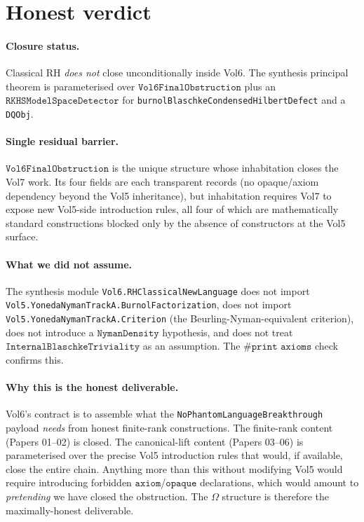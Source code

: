 \documentclass[11pt]{article}
\theoremstyle{plain}
\theoremstyle{definition}
\theoremstyle{remark}
\newcommand{\code}[1]{\texttt{#1}}
\newcommand{\Obs}{\Omega}
\begin{document}
\section{Honest verdict}
\label{sec:verdict}

\paragraph{Closure status.}
Classical RH \emph{does not} close unconditionally inside Vol6.
The synthesis principal theorem is parameterised over
\(\code{Vol6FinalObstruction}\) plus an
\(\code{RKHSModelSpaceDetector}\) for
\code{burnolBlaschkeCondensedHilbertDefect} and a \code{DQObj}.

\paragraph{Single residual barrier.}
\(\code{Vol6FinalObstruction}\) is the unique structure whose
inhabitation closes the Vol7 work.  Its four fields are
each transparent records (no opaque/axiom dependency beyond the Vol5
inheritance), but inhabitation requires Vol7 to expose new Vol5-side
introduction rules, all four of which are mathematically standard
constructions blocked only by the absence of constructors at the
Vol5 surface.

\paragraph{What we did not assume.}
The synthesis module \code{Vol6.RHClassicalNewLanguage} does not
import \code{Vol5.YonedaNymanTrackA.BurnolFactorization}, does not
import \code{Vol5.YonedaNymanTrackA.Criterion} (the
Beurling-Nyman-equivalent criterion), does not introduce a
\(\code{NymanDensity}\) hypothesis, and does not treat
\(\code{InternalBlaschkeTriviality}\) as an assumption.  The
\(\code{\#print axioms}\) check confirms this.

\paragraph{Why this is the honest deliverable.}
Vol6's contract is to assemble what the
\code{NoPhantomLanguageBreakthrough} payload \emph{needs} from
honest finite-rank constructions.  The finite-rank content (Papers
01--02) is closed.  The canonical-lift content (Papers 03--06) is
parameterised over the precise Vol5 introduction rules that would,
if available, close the entire chain.  Anything more than this
without modifying Vol5 would require introducing forbidden
\(\code{axiom}\)/\(\code{opaque}\) declarations, which would amount
to \emph{pretending} we have closed the obstruction.  The
\(\Obs\) structure is therefore the maximally-honest
deliverable.
\end{document}
